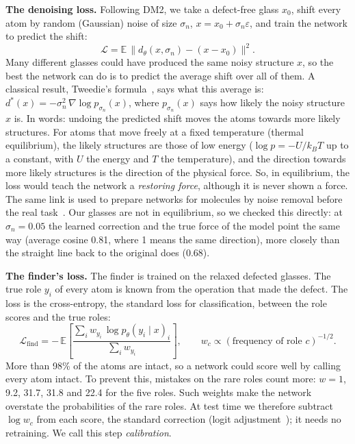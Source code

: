 \documentclass[10pt]{article}
\begin{document}
\textbf{The denoising loss.} Following DM2, we take a defect-free glass $x_0$, shift every atom by random (Gaussian) noise of size $\sigma_n$, $x=x_0+\sigma_n\varepsilon$, and train the network to predict the shift:
\begin{equation}
\mathcal{L}=\mathbb{E}\,\big\|d_\theta(x,\sigma_n)-(x-x_0)\big\|^2 .
\label{eq:loss}
\end{equation}
Many different glasses could have produced the same noisy structure $x$, so the best the network can do is to predict the average shift over all of them. A classical result, Tweedie's formula~\citep{efron2011,vincent2011}, says what this average is: $d^{*}(x)=-\sigma_n^{2}\,\nabla\log p_{\sigma_n}(x)$, where $p_{\sigma_n}(x)$ says how likely the noisy structure $x$ is. In words: undoing the predicted shift moves the atoms towards more likely structures. For atoms that move freely at a fixed temperature (thermal equilibrium), the likely structures are those of low energy ($\log p=-U/k_BT$ up to a constant, with $U$ the energy and $T$ the temperature), and the direction towards more likely structures is the direction of the physical force. So, in equilibrium, the loss would teach the network a \emph{restoring force}, although it is never shown a force. The same link is used to prepare networks for molecules by noise removal before the real task~\citep{zaidi2023}. Our glasses are not in equilibrium, so we checked this directly: at $\sigma_n=0.05$ the learned correction and the true force of the model point the same way (average cosine 0.81, where 1 means the same direction), more closely than the straight line back to the original does (0.68).

\textbf{The finder's loss.} The finder is trained on the relaxed defected glasses. The true role $y_i$ of every atom is known from the operation that made the defect. The loss is the cross-entropy, the standard loss for classification, between the role scores and the true roles:
\begin{equation}
\mathcal{L}_{\text{find}}=-\,\mathbb{E}\left[\frac{\sum_i w_{y_i}\,\log p_\theta(y_i\mid x)_i}{\sum_i w_{y_i}}\right],\qquad w_c\propto(\text{frequency of role }c)^{-1/2}.
\label{eq:find}
\end{equation}
More than 98\% of the atoms are intact, so a network could score well by calling every atom intact. To prevent this, mistakes on the rare roles count more: $w=1$, 9.2, 31.7, 31.8 and 22.4 for the five roles. Such weights make the network overstate the probabilities of the rare roles. At test time we therefore subtract $\log w_c$ from each score, the standard correction (logit adjustment~\citep{menon2021}); it needs no retraining. We call this step \emph{calibration}.
\end{document}

